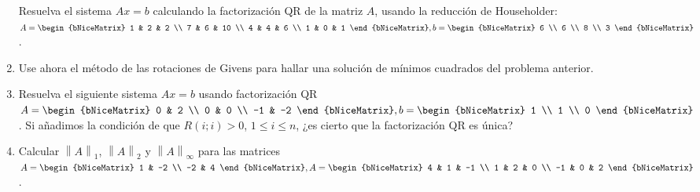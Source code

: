 \documentclass[
  spanish,
  8pt,
  utf8,
  xcolor=table,
  handout,
  aspectratio=169,
  professionalfonts,
  notheorems,
  mathserif,
]{beamer}
\newcounter{savedenum}
\newcommand*{\saveenum}{\setcounter{savedenum}{\theenumi}}
\begin{document}
\begin{frame}
\begin{enumerate}
		      Resuelva el sistema $Ax=b$ calculando la factorización QR
		      de la matriz $A$, usando la reducción de Householder:
		      \begin{math}
			      A=
			      \begin{bNiceMatrix}
				      1 & 2 & 2  \\
				      7 & 6 & 10 \\
				      4 & 4 & 6  \\
				      1 & 0 & 1
			      \end{bNiceMatrix},
			      b=
			      \begin{bNiceMatrix}
				      6 \\
				      6 \\
				      8 \\
				      3
			      \end{bNiceMatrix}
		      \end{math}.

		\item

		      Use ahora el método de las rotaciones de Givens para hallar
		      una solución de mínimos cuadrados del problema anterior.

		\item

		      Resuelva el siguiente sistema $Ax=b$ usando factorización
		      QR
		      \begin{math}
			      A=
			      \begin{bNiceMatrix}
				      0  & 2  \\
				      0  & 0  \\
				      -1 & -2
			      \end{bNiceMatrix},
			      b=
			      \begin{bNiceMatrix}
				      1 \\
				      1 \\
				      0
			      \end{bNiceMatrix}
		      \end{math}.
		      Si añadimos la condición de que $R\left(i;i\right)>0$,
		      $1\leq i\leq n$, ¿es cierto que la factorización QR es
		      única?

		\item

		      Calcular ${\left\|A\right\|}_{1}$, ${\left\|A\right\|}_{2}$
		      y ${\left\|A\right\|}_{\infty}$ para las matrices
		      \begin{math}
			      A=
			      \begin{bNiceMatrix}
				      1  & -2 \\
				      -2 & 4
			      \end{bNiceMatrix},
			      A=
			      \begin{bNiceMatrix}
				      4  & 1 & -1 \\
				      1  & 2 & 0  \\
				      -1 & 0 & 2
			      \end{bNiceMatrix}
		      \end{math}.
		      \saveenum
	\end{enumerate}
\end{frame}
\end{document}
